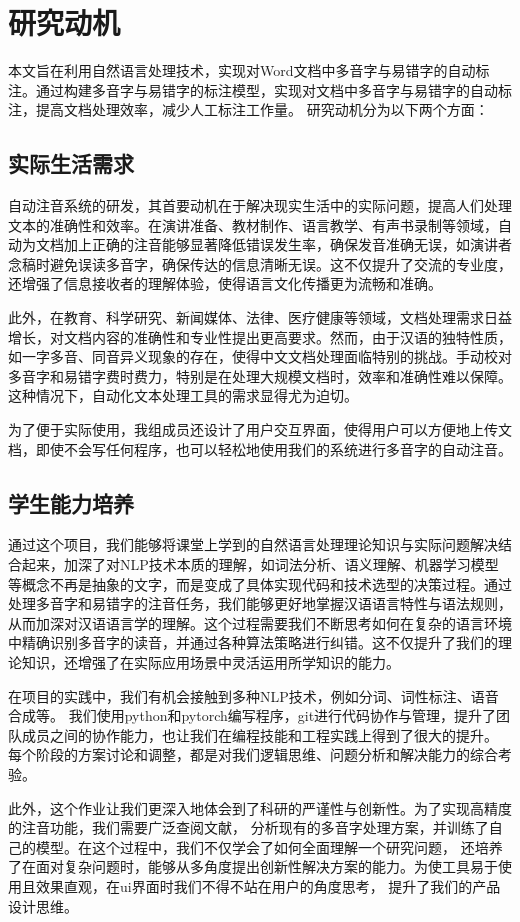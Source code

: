 \documentclass[12pt,hyperref,a4paper,UTF8]{ctexart}
\begin{document}
\section{研究动机}
本文旨在利用自然语言处理技术，实现对Word文档中多音字与易错字的自动标注。通过构建多音字与易错字的标注模型，实现对文档中多音字与易错字的自动标注，提高文档处理效率，减少人工标注工作量。
研究动机分为以下两个方面：
\subsection{实际生活需求}
自动注音系统的研发，其首要动机在于解决现实生活中的实际问题，提高人们处理文本的准确性和效率。在演讲准备、教材制作、语言教学、有声书录制等领域，自动为文档加上正确的注音能够显著降低错误发生率，确保发音准确无误，如演讲者念稿时避免误读多音字，确保传达的信息清晰无误。这不仅提升了交流的专业度，还增强了信息接收者的理解体验，使得语言文化传播更为流畅和准确。

此外，在教育、科学研究、新闻媒体、法律、医疗健康等领域，文档处理需求日益增长，对文档内容的准确性和专业性提出更高要求。然而，由于汉语的独特性质，如一字多音、同音异义现象的存在，使得中文文档处理面临特别的挑战。手动校对多音字和易错字费时费力，特别是在处理大规模文档时，效率和准确性难以保障。这种情况下，自动化文本处理工具的需求显得尤为迫切。

为了便于实际使用，我组成员还设计了用户交互界面，使得用户可以方便地上传文档，即使不会写任何程序，也可以轻松地使用我们的系统进行多音字的自动注音。
\subsection{学生能力培养}
通过这个项目，我们能够将课堂上学到的自然语言处理理论知识与实际问题解决结合起来，加深了对NLP技术本质的理解，如词法分析、语义理解、机器学习模型等概念不再是抽象的文字，而是变成了具体实现代码和技术选型的决策过程。通过处理多音字和易错字的注音任务，我们能够更好地掌握汉语语言特性与语法规则，从而加深对汉语语言学的理解。这个过程需要我们不断思考如何在复杂的语言环境中精确识别多音字的读音，并通过各种算法策略进行纠错。这不仅提升了我们的理论知识，还增强了在实际应用场景中灵活运用所学知识的能力。

在项目的实践中，我们有机会接触到多种NLP技术，例如分词、词性标注、语音合成等。
我们使用python和pytorch编写程序，git进行代码协作与管理，提升了团队成员之间的协作能力，也让我们在编程技能和工程实践上得到了很大的提升。
每个阶段的方案讨论和调整，都是对我们逻辑思维、问题分析和解决能力的综合考验。

此外，这个作业让我们更深入地体会到了科研的严谨性与创新性。为了实现高精度的注音功能，我们需要广泛查阅文献，
分析现有的多音字处理方案，并训练了自己的模型。在这个过程中，我们不仅学会了如何全面理解一个研究问题，
还培养了在面对复杂问题时，能够从多角度提出创新性解决方案的能力。为使工具易于使用且效果直观，在ui界面时我们不得不站在用户的角度思考，
提升了我们的产品设计思维。
\end{document}
